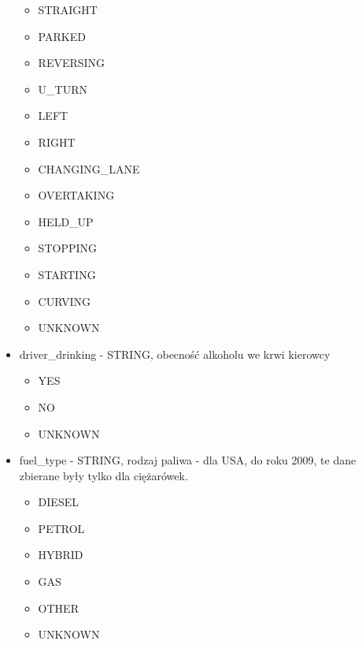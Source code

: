 \begin{itemize}
  \begin{itemize}
  \itemsep-14pt\parskip0pt
  \item
    STRAIGHT\\
  \item
    PARKED\\
  \item
    REVERSING\\
  \item
    U\_TURN\\
  \item
    LEFT\\
  \item
    RIGHT\\
  \item
    CHANGING\_LANE\\
  \item
    OVERTAKING\\
  \item
    HELD\_UP\\
  \item
    STOPPING\\
  \item
    STARTING\\
  \item
    CURVING\\
  \item
    UNKNOWN\\
  \end{itemize}
\item
  driver\_drinking - STRING, obecność alkoholu we krwi kierowcy

  \begin{itemize}
  \itemsep-14pt\parskip0pt
  \item
    YES\\
  \item
    NO\\
  \item
    UNKNOWN\\
  \end{itemize}
\item
  fuel\_type - STRING, rodzaj paliwa - dla USA, do roku 2009, te dane
  zbierane były tylko dla ciężarówek.

  \begin{itemize}
  \itemsep-14pt\parskip0pt
  \item
    DIESEL\\
  \item
    PETROL\\
  \item
    HYBRID\\
  \item
    GAS\\
  \item
    OTHER\\
  \item
    UNKNOWN
  \end{itemize}
\end{itemize}

